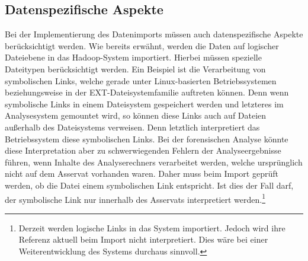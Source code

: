 
\subsection{Datenspezifische Aspekte}
Bei der Implementierung des Datenimports müssen auch datenspezifische Aspekte berücksichtigt werden. Wie bereits erwähnt, werden die Daten auf logischer Dateiebene in das Hadoop-System importiert.
 Hierbei müssen spezielle Dateitypen berücksichtigt werden. Ein Beispiel ist die Verarbeitung von symbolischen Links, welche gerade unter Linux-basierten Betriebssystemen beziehungsweise in der EXT-Dateisystemfamilie auftreten können. Denn wenn symbolische Links in einem Dateisystem gespeichert werden und letzteres im Analysesystem gemountet wird, so können diese Links auch auf Dateien außerhalb des Dateisystems verweisen.
Denn letztlich interpretiert das Betriebssystem diese symbolischen Links. Bei der forensischen Analyse könnte diese  Interpretation aber zu schwerwiegenden Fehlern der Analyseergebnisse führen, wenn Inhalte des Analyserechners verarbeitet werden, welche ursprünglich nicht auf dem Asservat vorhanden waren. Daher muss beim Import geprüft werden, ob die Datei einem symbolischen Link entspricht.
Ist dies der Fall darf, der symbolische Link nur innerhalb des Asservats interpretiert werden.\footnote{Derzeit werden logische Links in das System importiert. Jedoch wird ihre Referenz aktuell beim Import nicht interpretiert. Dies wäre bei einer Weiterentwicklung des Systems durchaus sinnvoll.} \\


